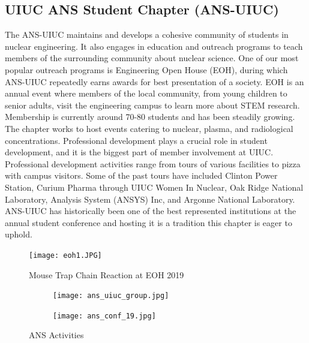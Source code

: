 \subsection{UIUC ANS Student Chapter (ANS-UIUC)}
The ANS-UIUC maintains and develops a cohesive community of students in nuclear 
engineering. It also engages in education and outreach programs to teach 
members of the surrounding community about nuclear science. One of our most 
popular outreach programs is Engineering Open House (EOH), during which 
ANS-UIUC repeatedly earns awards for best presentation of a society. EOH is an 
annual event where members of the local community, from young children to 
senior adults, visit the engineering campus to learn more about STEM research. 
Membership is currently around 70-80 students and has been steadily growing. 
The chapter works to host events catering to nuclear, plasma, and radiological 
concentrations. Professional development plays a crucial role in student 
development, and it is the biggest part of member involvement at UIUC. 
Professional development activities range from tours of various facilities to 
pizza with campus visitors. Some of the past tours have included Clinton Power 
Station, Curium Pharma through UIUC Women In Nuclear, Oak Ridge National 
Laboratory, Analysis System (ANSYS) Inc, and Argonne National Laboratory. 
ANS-UIUC has historically been one of the best represented institutions at the 
annual student conference and hosting it is a tradition this chapter is eager 
to uphold. 


\begin{figure}[H]
  \centering
  \texttt{[image: eoh1.JPG]}
  \caption{Mouse Trap Chain Reaction at EOH 2019}
\end{figure}

\begin{figure}[H]
  \centering
  \begin{subfigure}{0.5\textwidth}
    \centering
    \texttt{[image: ans\_uiuc\_group.jpg]}
  \end{subfigure}%
  \begin{subfigure}{0.5\textwidth}
    \centering
    \texttt{[image: ans\_conf\_19.jpg]}
  \end{subfigure}   
  \caption{ANS Activities}
\end{figure} 


